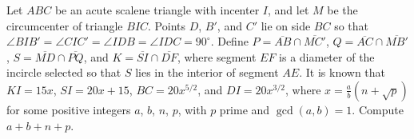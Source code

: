 Let $ABC$ be an acute scalene triangle with incenter $I$, and let $M$ be the circumcenter of triangle $BIC$.  Points $D$, $B'$, and $C'$ lie on side $BC$ so that $ \angle BIB' = \angle CIC' = \angle IDB = \angle IDC = 90^{\circ} $.  Define $P = \overline{AB} \cap \overline{MC'}$, $Q = \overline{AC} \cap \overline{MB'}$, $S = \overline{MD} \cap \overline{PQ}$, and $K = \overline{SI} \cap \overline{DF}$, where segment $EF$ is a diameter of the incircle selected so that $S$ lies in the interior of segment $AE$.  It is known that $KI=15x$, $SI=20x+15$, $BC=20x^{5/2}$, and $DI=20x^{3/2}$, where $x = \frac ab(n+\sqrt p)$ for some positive integers $a$, $b$, $n$, $p$, with $p$ prime and $\gcd(a,b)=1$. Compute $a+b+n+p$.
